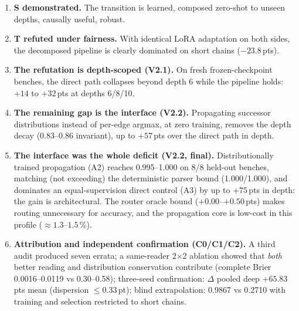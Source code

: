 \documentclass[11pt,a4paper]{article}
\newcommand{\dpt}{\ensuremath{\Delta}}
\begin{document}
\begin{enumerate}
\item \textbf{S demonstrated.} The transition is learned, composed zero-shot to unseen depths, causally useful, robust.
\item \textbf{T refuted under fairness.} With identical LoRA adaptation on both sides, the decomposed pipeline is clearly dominated on short chains ($-23.8$\,pts).
\item \textbf{The refutation is depth-scoped (V2.1).} On fresh frozen-checkpoint benches, the direct path collapses beyond depth 6 while the pipeline holds: $+14$ to $+32$\,pts at depths 6/8/10.
\item \textbf{The remaining gap is the interface (V2.2).} Propagating successor distributions instead of per-edge argmax, at zero training, removes the depth decay (0.83--0.86 invariant), up to $+57$\,pts over the direct path in depth.
\item \textbf{The interface was the whole deficit (V2.2, final).} Distributionally trained propagation (A2) reaches 0.995--1.000 on 8/8 held-out benches, matching (not exceeding) the deterministic parser bound (1.000/1.000), and dominates an equal-supervision direct control (A3) by up to $+75$\,pts in depth: the gain is architectural. The router oracle bound ($+0.00$--$+0.50$\,pts) makes routing unnecessary for accuracy, and the propagation core is low-cost in this profile ($\approx1.3$--$1.5$\,\%).
\item \textbf{Attribution and independent confirmation (C0/C1/C2).} A third audit produced seven errata; a same-reader 2$\times$2 ablation showed that \emph{both} better reading and distribution conservation contribute (complete Brier 0.0016--0.0119 vs 0.30--0.58); three-seed confirmation: $\dpt$ pooled deep $+65.83$\,pts mean (dispersion $\le0.33$\,pt); blind extrapolation: 0.9867 vs 0.2710 with training and selection restricted to short chains.
\end{enumerate}
\end{document}
